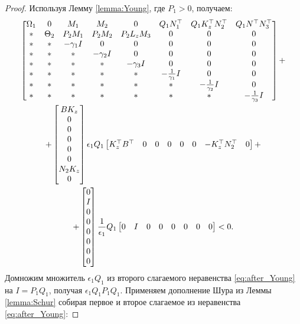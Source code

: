\begin{proof}
	Используя Лемму \ref{lemma:Young}, где $P_1>0$, получаем:
	\begin{multline}
		\label{eq:after_Young}
		\begin{bmatrix}
			{\Omega}_1 & 0 & {M}_1 & {M}_2 & 0& {Q}_1{N}_1^\top & {Q}_1{K}_z^\top{N}_2^\top & {Q}_1 {N}^\top{N}_3^\top 
			\\
			* & {\Theta}_2 & {P}_2{M}_1 & {P}_2{M}_2 & {P}_2{L}_z{M}_3 & 0 & 0 & 0\\
			* & * & -\gamma_1{I} & 0&0&0&0&0\\
			* & * & * & -\gamma_2{I}&0&0&0&0\\
			* & * & * & *&-\gamma_3{I}&0&0&0\\
			* & * & * & *&*&-\frac{1}{\gamma_1}{I}&0&0\\
			* & * & * & *&*&*&-\frac{1}{\gamma_2}{I}&0\\
			*&* & * & * & *&*&*&-\frac{1}{\gamma_3}{I}
		\end{bmatrix}
		+
		\\
		+\begin{bmatrix}
			B K_z \\0\\0\\0\\0\\0\\N_2 K_z\\0
		\end{bmatrix}
		\epsilon_1 Q_1
		\begin{bmatrix}
			K_z^\top B^\top & 0 & 0&0&0&0&-{K}_z^\top{N}_2^\top&0
		\end{bmatrix}
		+
		\\
		+\begin{bmatrix}
			0 \\I\\0\\0\\0\\0\\0\\0
		\end{bmatrix}
		\frac{1}{\epsilon_1}{Q}_1
		\begin{bmatrix}
			0 & I & 0&0&0&0&0&0
		\end{bmatrix}
		<0.
	\end{multline}
	Домножим множитель $\epsilon_1 Q_1$ из второго слагаемого неравенства \eqref{eq:after_Young} на $I = P_1 Q_1$, получая  $\epsilon_1 Q_1 P_1 Q_1$. 
	Применяем дополнение Шура из Леммы {\ref{lemma:Schur}} собирая первое и второе слагаемое из неравенства \eqref{eq:after_Young}:

\end{proof}
